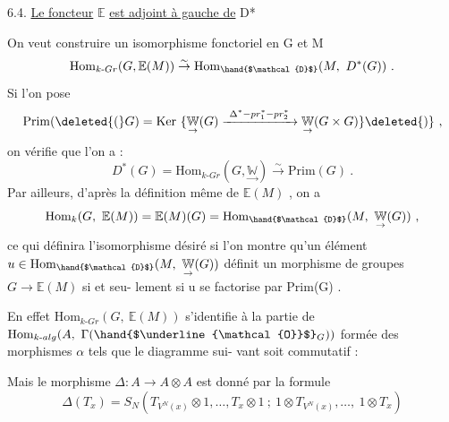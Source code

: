 
6.4. \uline{Le foncteur} $\mathbb{E}$ \uline{est adjoint à gauche de} D*

On veut construire un isomorphisme fonctoriel en G et M
\[ \mathrm{Hom}_{k\text{-}Gr}(G,\mathbb{E}(M)) \overset{\sim}{\to} \mathrm{Hom}_{\hand{$\mathcal{D}$}}(M,\ D^*(G)) \ . \]
Si l'on pose
\[ \mathrm{Prim}(\deleted{(}G) = \mathrm{Ker}\ \{\underset{\rightarrow}{\mathbb{W}}(G) \xrightarrow{\ \Delta^*-pr_1^*-pr_2^*\ } \underset{\rightarrow}{\mathbb{W}}(G \times G)\}\deleted{)}\ , \]
on vérifie que l'on a :
\[ D^*(G) = \mathrm{Hom}_{k\text{-}Gr}(G,\underset{\rightarrow}{\mathbb{W}}) \overset{\sim}{\to} \mathrm{Prim}(G)\ . \]
Par ailleurs, d'après la définition même de $\mathbb{E}(M)$ , on a
\[ \mathrm{Hom}_k(G,\ \mathbb{E}(M)) = \mathbb{E}(M)(G) = \mathrm{Hom}_{\hand{$\mathcal{D}$}}(M,\ \underset{\rightarrow}{\mathbb{W}}(G))\ , \]
ce qui définira l'isomorphisme désiré si l'on montre qu'un élément
$u \in \mathrm{Hom}_{\hand{$\mathcal{D}$}}(M,\ \underset{\rightarrow}{\mathbb{W}}(G))$ définit un morphisme de groupes $G \to \mathbb{E}(M)$ si et seu-%
lement si u se factorise par Prim(G) .

En effet $\mathrm{Hom}_{k\text{-}Gr}(G,\ \mathbb{E}(M))$ s'identifie à la partie de
$\mathrm{Hom}_{k\text{-}alg}(A,\ \Gamma(\hand{$\underline{\mathcal{O}}$}_G))$ formée des morphismes $\alpha$ tels que le diagramme sui-%
vant soit commutatif :

Mais le morphisme $\Delta : A \to A \otimes A$ est donné par la formule
\[ \Delta(T_x) = S_N(T_{V^N(x)} \otimes 1, \ldots, T_x \otimes 1\ ;\ 1 \otimes T_{V^N(x)}, \ldots,\ 1 \otimes T_x) \]

